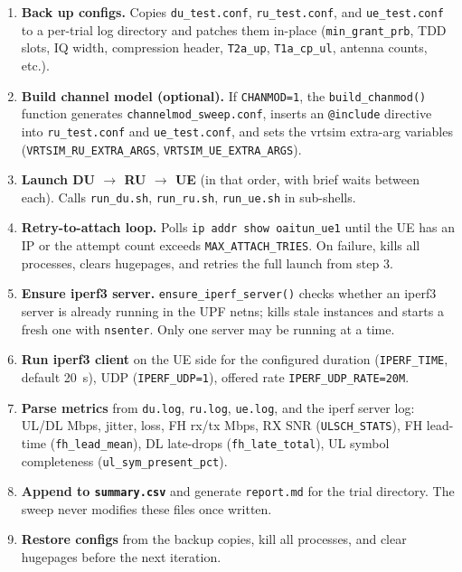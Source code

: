 \documentclass[11pt,a4paper]{article}
\begin{document}
\begin{enumerate}[leftmargin=1.8em]
\item \textbf{Back up configs.} Copies \texttt{du\_test.conf}, \texttt{ru\_test.conf}, and
  \texttt{ue\_test.conf} to a per-trial log directory and patches them in-place
  (\texttt{min\_grant\_prb}, TDD slots, IQ width, compression header, \texttt{T2a\_up},
  \texttt{T1a\_cp\_ul}, antenna counts, etc.).

\item \textbf{Build channel model (optional).} If \texttt{CHANMOD=1}, the
  \texttt{build\_chanmod()} function generates \texttt{channelmod\_sweep.conf}, inserts an
  \texttt{@include} directive into \texttt{ru\_test.conf} and \texttt{ue\_test.conf}, and
  sets the vrtsim extra-arg variables (\texttt{VRTSIM\_RU\_EXTRA\_ARGS},
  \texttt{VRTSIM\_UE\_EXTRA\_ARGS}).

\item \textbf{Launch DU $\rightarrow$ RU $\rightarrow$ UE} (in that order, with brief waits
  between each). Calls \texttt{run\_du.sh}, \texttt{run\_ru.sh}, \texttt{run\_ue.sh} in
  sub-shells.

\item \textbf{Retry-to-attach loop.} Polls \texttt{ip addr show oaitun\_ue1} until the UE
  has an IP or the attempt count exceeds \texttt{MAX\_ATTACH\_TRIES}. On failure, kills all
  processes, clears hugepages, and retries the full launch from step 3.

\item \textbf{Ensure iperf3 server.} \texttt{ensure\_iperf\_server()} checks whether an
  iperf3 server is already running in the UPF netns; kills stale instances and starts a
  fresh one with \texttt{nsenter}. Only one server may be running at a time.

\item \textbf{Run iperf3 client} on the UE side for the configured duration
  (\texttt{IPERF\_TIME}, default 20~s), UDP (\texttt{IPERF\_UDP=1}),
  offered rate \texttt{IPERF\_UDP\_RATE=20M}.

\item \textbf{Parse metrics} from \texttt{du.log}, \texttt{ru.log}, \texttt{ue.log}, and the
  iperf server log: UL/DL Mbps, jitter, loss, FH rx/tx Mbps, RX SNR
  (\texttt{ULSCH\_STATS}), FH lead-time (\texttt{fh\_lead\_mean}), DL late-drops
  (\texttt{fh\_late\_total}), UL symbol completeness (\texttt{ul\_sym\_present\_pct}).

\item \textbf{Append to \texttt{summary.csv}} and generate \texttt{report.md} for the
  trial directory. The sweep never modifies these files once written.

\item \textbf{Restore configs} from the backup copies, kill all processes, and clear
  hugepages before the next iteration.
\end{enumerate}
\end{document}
